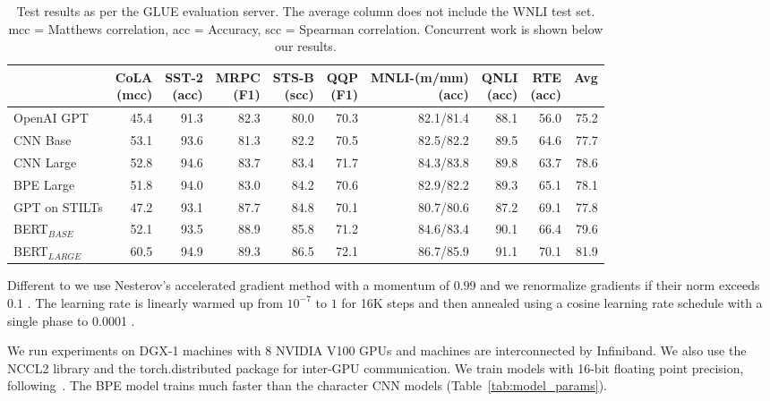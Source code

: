 \documentclass[11pt,a4paper]{article}
\begin{document}
\begin{table}[t]
\centering
\begin{tabular}{lrrrrrrrrr}
\toprule
& \thead{CoLA\\(mcc)} & \thead{SST-2\\(acc)} & \thead{MRPC\\(F1)} & \thead{STS-B\\(scc)} & \thead{QQP\\(F1)} & \thead{MNLI-(m/mm)\\(acc)} & \thead{QNLI\\(acc)} & \thead{RTE\\(acc)} & Avg \\
\midrule
OpenAI GPT     & 45.4 & 91.3 & 82.3 & 80.0 & 70.3 & 82.1/81.4 & 88.1 & 56.0 & 75.2\\
\midrule
CNN Base       & 53.1 & 93.6 & 81.3 & 82.2 & 70.5 & 82.5/82.2 & 89.5 & 64.6 & 77.7 \\
CNN Large      & 52.8 & 94.6 & 83.7 & 83.4 & 71.7 & 84.3/83.8 & 89.8 & 63.7 & 78.6 \\
BPE Large      & 51.8 & 94.0 & 83.0 & 84.2 & 70.6 & 82.9/82.2 & 89.3 & 65.1 & 78.1 \\
\midrule
GPT on STILTs  & 47.2 & 93.1 & 87.7 & 84.8 & 70.1 & 80.7/80.6 & 87.2 & 69.1 & 77.8 \\
BERT$_{BASE}$  & 52.1 & 93.5 & 88.9 & 85.8 & 71.2 & 84.6/83.4 & 90.1 & 66.4 & 79.6 \\
BERT$_{LARGE}$ & 60.5 & 94.9 & 89.3 & 86.5 & 72.1 & 86.7/85.9 & 91.1 & 70.1 & 81.9 \\
\bottomrule
\end{tabular}
\caption{Test results as per the GLUE evaluation server. The average column does not include the WNLI test set. mcc = Matthews correlation, acc = Accuracy, scc = Spearman correlation.
Concurrent work is shown below our results.}
\label{tab:glue}
\end{table}


Different to \citet{vaswani2017transformer} we use Nesterov's accelerated gradient method \citep{sutskever2013icml} with a momentum of $0.99$ and we renormalize gradients if their norm exceeds $0.1$ \citep{pascanu2013difficulty}.
The learning rate is linearly warmed up from $10^{-7}$ to $1$ for 16K steps and then annealed using a cosine learning rate schedule with a single phase to 0.0001 \citep{cosine}.

We run experiments on DGX-1 machines with 8 NVIDIA V100 GPUs and machines are interconnected by Infiniband.
We also use the NCCL2 library and the torch.distributed package for inter-GPU communication.
We train models with 16-bit floating point precision, following~\citet{ott2018scaling}.
The BPE model trains much faster than the character CNN models (Table~\ref{tab:model_params}).
\end{document}
